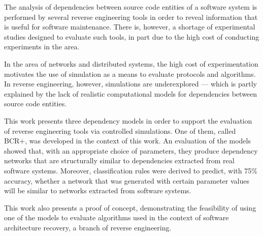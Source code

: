 
The analysis of dependencies between source code entities of a software system is performed by several reverse engineering tools in order to reveal information that is useful for software maintenance. There is, however, a shortage of experimental studies designed to evaluate such tools, in part due to the high cost of conducting experiments in the area.

In the area of networks and distributed systems, the high cost of experimentation motivates the use of simulation as a means to evaluate protocols and algorithms. In reverse engineering, however, simulations are underexplored --- which is partly explained by the lack of realistic computational models for dependencies between source code entities.

This work presents three dependency models in order to support the evaluation of reverse engineering tools via controlled simulations. One of them, called BCR+, was developed in the context of this work. An evaluation of the models showed that, with an appropriate choice of parameters, they produce dependency networks that are structurally similar to dependencies extracted from real software systems. Moreover, classification rules were derived to predict, with 75\% accuracy, whether a network that was generated with certain parameter values will be similar to networks extracted from software systems.

This work also presents a proof of concept, demonstrating the feasibility of using one of the models to evaluate algorithms used in the context of software architecture recovery, a branch of reverse engineering.
